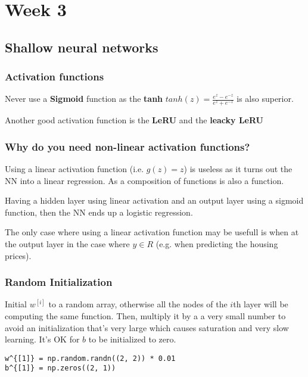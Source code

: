 \section*{Week 3}
\subsection*{Shallow neural networks}

\subsubsection*{Activation functions}
Never use a \textbf{Sigmoid} function as the \textbf{tanh} $tanh(z) = \frac{e^{z} - e^{-z}}{e^{z} + e^{-z}}$ is also superior.

Another good activation function is the \textbf{LeRU} and the \textbf{leacky LeRU}

\subsubsection*{Why do you need non-linear activation functions?}
Using a linear activation function (i.e. $g(z) = z$) is useless as it turns out the NN into a linear regression. As a composition of functions is also a function.

Having a hidden layer using linear activation and an output layer using a sigmoid function, then the NN ends up a logistic regression.

The only case where using a linear activation function may be usefull is when at the output layer in the case where $y \in R$ (e.g. when predicting the housing prices).


\subsubsection*{Random Initialization}
Initial $w^{[i]}$ to a random array, otherwise all the nodes of the $i$th layer will be computing the same function. Then, multiply it by a a very small number to avoid an initialization that's very large which causes saturation and very slow learning. It's OK for $b$ to be initialized to zero.

\begin{lstlisting}
w^{[1]} = np.random.randn((2, 2)) * 0.01
b^{[1]} = np.zeros((2, 1))
\end{lstlisting}


